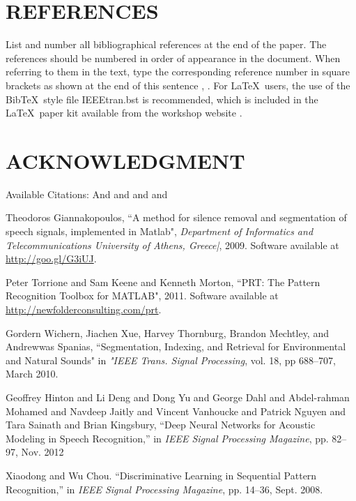 \documentclass{article}
\begin{document}
\begin{sloppy}
\section{REFERENCES}
\label{sec:ref}

List and number all bibliographical references at the end 
of the paper. The references should be numbered in order 
of appearance in the document. When referring to them in 
the text, type the corresponding reference number in 
square brackets as shown at the end of this sentence 
\cite{cJones2003}, \cite{aSmith2000}. For \LaTeX\ users, 
the use of the Bib\TeX\ style file IEEEtran.bst is 
recommended, which is included in the \LaTeX\ paper 
kit available from the workshop website \cite{aaspweb}.

\section{ACKNOWLEDGMENT}
\label{sec:ack}

Available Citations:
\cite{segmentFeature}  And \cite{silenceRemove} and \cite{prt2011} and \cite{discrimPRT} and \cite{dnn}

%
%

 \begin{thebibliography}{5}
	Theodoros Giannakopoulos, ``A method for silence removal and segmentation of speech signals, implemented in Matlab",\emph{ Department of Informatics and Telecommunications University of Athens, Greece|}, 2009. Software available at \url{http://goo.gl/G3iUJ}.

 Peter Torrione and Sam Keene and Kenneth Morton, ``{PRT}: The Pattern Recognition Toolbox for {MATLAB}", 2011. Software available at \url{http://newfolderconsulting.com/prt}.

 	Gordern Wichern, Jiachen Xue, Harvey Thornburg, Brandon Mechtley, and Andrewwas Spanias, ``Segmentation, Indexing, and Retrieval for Environmental and Natural Sounds" in \emph{"IEEE Trans. Signal Processing}, vol. 18, pp 688--707, March 2010.

Geoffrey Hinton and Li Deng and Dong Yu and George Dahl and Abdel-rahman Mohamed and Navdeep Jaitly and Vincent Vanhoucke and Patrick Nguyen and Tara Sainath and Brian Kingsbury,  ``Deep Neural Networks for Acoustic Modeling in Speech Recognition,'' in \emph{IEEE Signal Processing Magazine}, pp. 82--97, Nov. 2012
 
Xiaodong and Wu Chou. ``Discriminative Learning in Sequential Pattern Recognition,''  in \emph{IEEE Signal Processing Magazine}, pp. 14--36, Sept. 2008.
 
 \end{thebibliography}


\end{sloppy}
\end{document}
